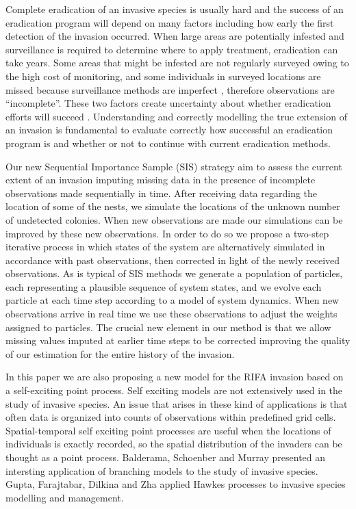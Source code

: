 \documentclass[11pt,a4paper]{article}
\begin{document}
Complete eradication of an invasive species is usually hard and the success of an eradication program will depend on many factors including how early the first detection of the invasion occurred. When large areas are potentially infested and surveillance is required to determine where to apply treatment, eradication can take years. Some areas that might be infested are not regularly surveyed owing to the high cost of monitoring, and some individuals in surveyed locations are missed because surveillance methods are imperfect \cite{Royle}, therefore observations are “incomplete”. These two factors create uncertainty about whether eradication efforts will succeed  \cite{Keith}. Understanding and correctly modelling the true extension of an invasion is fundamental to evaluate correctly how successful an eradication program is and whether or not to continue with current eradication methods. 

Our new Sequential Importance Sample (SIS) strategy aim to assess the current extent of an invasion imputing missing data in the presence of incomplete observations made sequentially in time. After receiving data regarding the location of some of the nests, we simulate the locations of the unknown number of undetected colonies. When new observations are made our simulations can be improved by these new observations. In order to do so we propose a two-step iterative process in which states of the system are alternatively simulated in accordance with past observations, then corrected in light of the newly received observations. As is typical of SIS methods we generate a population of particles, each representing a plausible sequence of system states, and we evolve each particle at each time step according to a model of system dynamics. When new observations arrive in real time we use these observations to adjust the weights assigned to particles. The crucial new element in our method is that we allow missing values imputed at earlier time steps to be corrected improving the quality of our estimation for the entire history of the invasion.

In this paper we are also proposing a new model for the RIFA invasion based on a self-exciting point process. Self exciting models are not extensively used in the study of invasive species. An issue that arises in these kind of applications is that often data is organized into counts of observations within predefined grid cells. Spatial-temporal self exciting point processes are useful when the locations of individuals is exactly recorded, so the spatial distribution of the invaders can be thought as a point process. Balderama, Schoenber and Murray \cite{Balderama} presented an intersting application of branching models to the study of invasive species. Gupta, Farajtabar, Dilkina and Zha \cite{Gupta} applied Hawkes processes to invasive species modelling and management.
\end{document}
